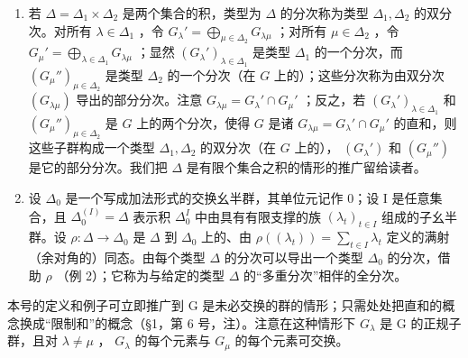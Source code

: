\begin{enumerate}
\def\labelenumi{(\arabic{enumi})}
\setcounter{enumi}{2}
\item
  若 \(\Delta = \Delta_1 \times \Delta_2\) 是两个集合的积，类型为 \(\Delta\) 的分次称为类型 \(\Delta_1, \Delta_2\) 的双分次。对所有 \(\lambda \in \Delta_1\) ，令 \(G_{\lambda}' = \bigoplus_{\mu \in \Delta_2} G_{\lambda\mu}\) ；对所有 \(\mu \in \Delta_2\) ，令 \(G_{\mu}' = \bigoplus_{\lambda \in \Delta_1} G_{\lambda\mu}\) ；显然 \((G_{\lambda}')_{\lambda \in \Delta_1}\) 是类型 \(\Delta_1\) 的一个分次，而 \((G_{\mu}'')_{\mu \in \Delta_2}\) 是类型 \(\Delta_2\) 的一个分次（在 \(G\) 上的）；这些分次称为由双分次 \((G_{\lambda\mu})\) 导出的部分分次。注意 \(G_{\lambda\mu} = G_{\lambda}' \cap G_{\mu}'\) ；反之，若 \((G_{\lambda}')_{\lambda \in \Delta_1}\) 和 \((G_{\mu}'')_{\mu \in \Delta_2}\) 是 \(G\) 上的两个分次，使得 \(G\) 是诸 \(G_{\lambda\mu} = G_{\lambda}' \cap G_{\mu}'\) 的直和，则这些子群构成一个类型 \(\Delta_1, \Delta_2\) 的双分次（在 \(G\) 上的）， \((G_{\lambda}')\) 和 \((G_{\mu}'')\) 是它的部分分次。我们把 \(\Delta\) 是有限个集合之积的情形的推广留给读者。
\item
  设 \(\Delta_0\) 是一个写成加法形式的交换幺半群，其单位元记作 0；设 I 是任意集合，且 \(\Delta_0^{(I)} = \Delta\) 表示积 \(\Delta_0^I\) 中由具有有限支撑的族 \((\lambda_t)_{t \in I}\) 组成的子幺半群。设 \(\rho: \Delta \to \Delta_0\) 是 \(\Delta\) 到 \(\Delta_0\) 上的、由 \(\rho((\lambda_t)) = \sum_{t \in I} \lambda_t\) 定义的满射（余对角的）同态。由每个类型 \(\Delta\) 的分次可以导出一个类型 \(\Delta_0\) 的分次，借助 \(\rho\) （例 2）；它称为与给定的类型 \(\Delta\) 的“多重分次”相伴的全分次。
\end{enumerate}

本号的定义和例子可立即推广到 G 是未必交换的群的情形；只需处处把直和的概念换成“限制和”的概念（§1，第 6 号，注）。注意在这种情形下 \(G_{\lambda}\) 是 G 的正规子群，且对 \(\lambda \neq \mu\) ， \(G_{\lambda}\) 的每个元素与 \(G_{\mu}\) 的每个元素可交换。

